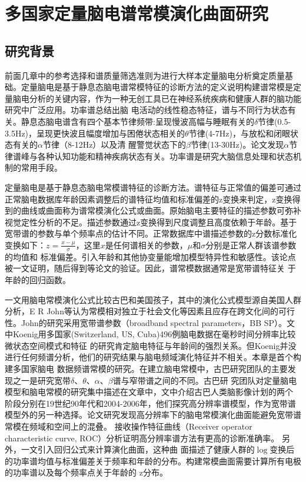 \chapter{多国家定量脑电谱常模演化曲面研究}
\section{研究背景}
前面几章中的参考选择和谱质量筛选准则为进行大样本定量脑电分析奠定质量基础。定量脑电是基于静息态脑电谱常模特征的诊断方法的定义说明构建谱常模是定量脑电分析的关键内容，作为一种无创工具已在神经系统疾病和健康人群的脑功能研究中广泛应用。功率谱总结出脑
电活动的线性稳态特征，谱与不同行为状态有关。静息态脑电谱含有四个基本节律频带:呈现慢波高幅与睡眠有关的$\delta$节律(0.5-3.5Hz)，呈现更快波且幅度增加与困倦状态相关的$\theta$节律(4-7Hz)，与放松和闭眼状态有关的$\alpha$节律（8-12Hz）以及清
醒警觉状态下的$\beta$节律(13-30Hz)。论文\cite{john1988neurometrics,buzsaki2006rhythms}发现$\alpha$节律谱峰与各种认知功能和精神疾病状态有关。功率谱是研究大脑信息处理和状态机制的常用手段。

定量脑电是基于静息态脑电常模谱特征的诊断方法。谱特征与正常值的偏差可通过正常脑电数据库年龄因素调整后的谱特征均值和标准偏差的z变换来判定，z变换得到的曲线或曲面称为谱常模演化公式或曲面。原始脑电主要特征的描述参数可弥补视觉定性分析的不足。描述参数通过z变换得到尺度调整且高度依赖于年龄。基于宽带谱的参数与单个频率点的估计不同。正常数据库中谱描述参数的z分数标准化变换如下：\(z=\frac{x-\mu}{\sigma}\)，这里$x$是任何谱相关的参数，$\mu$和$\sigma$分别是正常人群该谱参数的均值和
标准偏差。引入年龄和其他协变量能增加模型特异性和敏感性。该论点被\cite{john1980developmental}一文证明，随后得到\cite{matouvsek1973automatic,john1977neurometrics,alvarez1987eeg,amador1989structure}等论文的验证。因此，谱常模数据通常是宽带谱特征关
于年龄的回归函数。

\cite{alvarez1987eeg}一文用脑电常模演化公式比较古巴和美国孩子，其中的演化公式模型源自美国人群分析，E R John等认为常模相对独立于社会文化等因素且应存在跨文化间的可行性。John的研究采用宽带谱参数（broadband spectral parameters，BB
SP）。\cite{koenig2002millisecond}文中Koenig用多国家(Switzerland, US, Cuba)496例脑电数据在毫秒时间分辨率比较微状态空间模式和特征
的研究肯定脑电特征与年龄间的强烈关系。但Koenig并没进行任何频谱分析，他们的研究结果与脑电频域演化特征并不相关。本章是首个构建多国家脑电
数据频谱常模的研究。在建立脑电常模中，古巴研究团队的主要发现之一是研究宽带$\delta、\theta、\alpha、\beta$谱与窄带谱之间的不同。古巴研
究团队对定量脑电模型和脑电常模的研究集中描述在文章\cite{hernandez-gonzalez_multimodal_2011}中，文中介绍古巴人类脑影像计划的两个
阶段分别在19世纪90年代和2004-2006年，他们探究高分辨率谱模型，作为宽带谱模型外的另一种选择。论文\cite{szava1994high}研究发现高分辨率下的脑电常模演化曲面能避免宽带谱常模在频域和空间上的混叠。 接收操作特征曲线（Receiver operator characteristic curve, ROC）分析证明高分辨率谱方法有更高的诊断准确率。 另外，\cite{amador1990spatiotemporal}一文引入回归公式来计算演化曲面，这种曲
面描述了健康人群的$\log$变换后的功率谱均值与标准偏差关于频率和年龄的分布。构建常模曲面需要计算所有电极的功率谱以及每个频率点关于年龄的
z分布。

